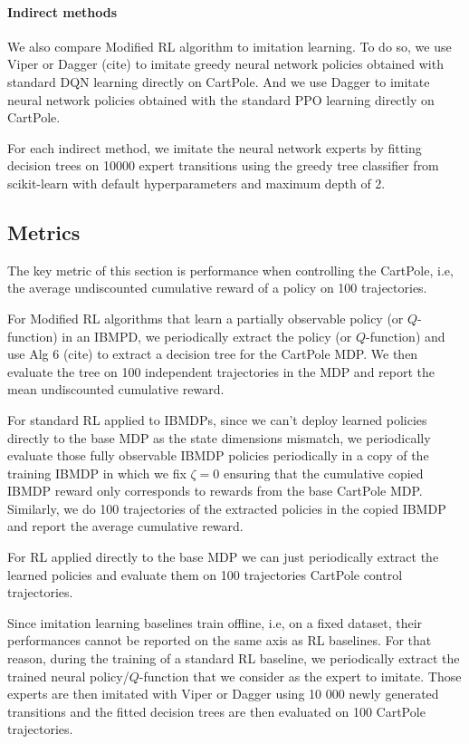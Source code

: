 \paragraph{Indirect methods} We also compare Modified RL algorithm to imitation learning.
To do so, we use Viper or Dagger (cite) to imitate greedy neural network policies obtained with standard DQN learning directly on CartPole.
And we use Dagger to imitate neural network policies obtained with the standard PPO learning directly on CartPole. 

For each indirect method, we imitate the neural network experts by fitting decision trees on 10000 expert transitions using the greedy tree classifier from scikit-learn with default hyperparameters and maximum depth of 2.
    

\subsection{Metrics}
The key metric of this section is performance when controlling the CartPole, i.e, the average undiscounted cumulative reward of a policy on 100 trajectories.

For Modified RL algorithms that learn a partially observable policy (or $Q$-function) in an IBMPD, we periodically extract the policy (or $Q$-function) and use Alg 6 (cite) to extract a decision tree for the CartPole MDP. 
We then evaluate the tree on 100 independent trajectories in the MDP and report the mean undiscounted cumulative reward.

For standard RL applied to IBMDPs, since we can't deploy learned policies directly to the base MDP as the state dimensions mismatch, we periodically evaluate those fully observable IBMDP policies periodically in a copy of the training IBMDP in which we fix $\zeta=0$ ensuring that the cumulative copied IBMDP reward only corresponds to rewards from the base CartPole MDP.
Similarly, we do 100 trajectories of the extracted policies in the copied IBMDP and report the average cumulative reward.

For RL applied directly to the base MDP we can just periodically extract the learned policies and evaluate them on 100 trajectories CartPole control trajectories.

Since imitation learning baselines train offline, i.e, on a fixed dataset, their performances cannot be reported on the same axis as RL baselines.
For that reason, during the training of a standard RL baseline, we periodically extract the trained neural policy/$Q$-function that we consider as the expert to imitate.
Those experts are then imitated with Viper or Dagger using 10 000 newly generated transitions and the fitted decision trees are then evaluated on 100 CartPole trajectories.

